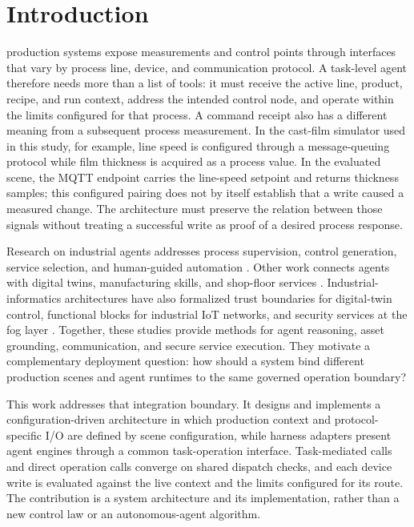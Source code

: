 \section{Introduction}
 production systems expose measurements and control
points through interfaces that vary by process line, device, and communication
protocol. A task-level agent therefore needs more than a list of tools: it must
receive the active line, product, recipe, and run context, address the intended
control node, and operate within the limits configured for that process. A
command receipt also has a different meaning from a subsequent process
measurement. In the cast-film simulator used in this study, for example, line
speed is configured through a message-queuing protocol while film thickness is
acquired as a process value. In the evaluated scene, the MQTT endpoint carries
the line-speed setpoint and returns thickness samples; this configured pairing
does not by itself establish that a write caused a measured change. The
architecture must preserve the relation between those signals without treating
a successful write as proof of a desired process response.

Research on industrial agents addresses process supervision, control
generation, service selection, and human-guided automation
\cite{xia2025control,huang2026made,koehle2026llmdriven,biskupovic2025supervision,
liu2026agents4plc,wu2025instructmpc,lim2025llmenabled,zhao2026shopfloor,
hofmann2025nlc}. Other work connects agents with digital twins, manufacturing
skills, and shop-floor services
\cite{xia2025architecture,silva2025mcpmanufacturing,
koehle2025semanticrecipes,graul2026aas,schall2026safe,lin2026agentic}.
Industrial-informatics architectures have also formalized trust boundaries for
digital-twin control, functional blocks for industrial IoT networks, and
security services at the fog layer
\cite{gehrmann2020dtiacs,mahmood2023functional,sengupta2021securefog}.
Together, these studies provide methods for agent reasoning, asset grounding,
communication, and secure service execution. They motivate a complementary
deployment question: how should a system bind different production scenes and
agent runtimes to the same governed operation boundary?

This work addresses that integration boundary. It designs and implements a
configuration-driven architecture in which production context and
protocol-specific I/O are defined by scene configuration, while harness
adapters present agent engines through a common task-operation interface.
Task-mediated calls and direct operation calls converge on shared dispatch
checks, and each device write is evaluated against the live context and the
limits configured for its route. The contribution is a system architecture
and its implementation, rather than a new control law or an autonomous-agent
algorithm.

